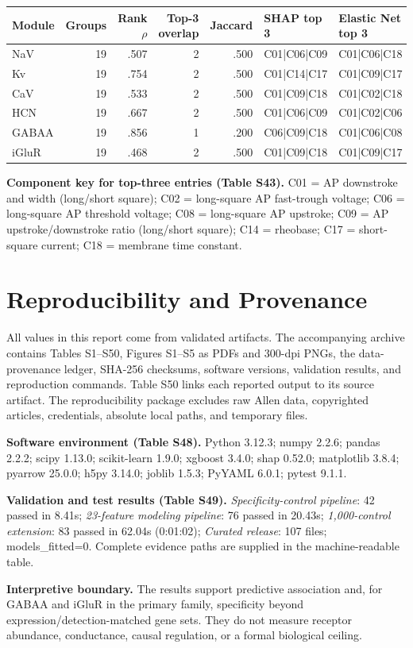 \documentclass[11pt]{article}
\newcommand{\tablefont}{\fontsize{9.5}{11.2}\selectfont}
\newcommand{\sourcecaption}[1]{\Needspace{10\baselineskip}\vspace{2pt}{\small\bfseries #1}\par\vspace{2pt}}
\begin{document}
\sourcecaption{Concordance between grouped TreeSHAP importance and grouped absolute Elastic Net coefficients (Table S47).}
\begin{center}\tablefont
\setlength{\tabcolsep}{2.7pt}
\begin{tabularx}{\linewidth}{@{}lrrrrYY@{}}
\toprule
Module & Groups & Rank $\rho$ & Top-3 overlap & Jaccard & SHAP top 3 & Elastic Net top 3 \\
\midrule
NaV & 19 & .507 & 2 & .500 & C01|C06|C09 & C01|C06|C18 \\
Kv & 19 & .754 & 2 & .500 & C01|C14|C17 & C01|C09|C17 \\
CaV & 19 & .533 & 2 & .500 & C01|C09|C18 & C01|C02|C18 \\
HCN & 19 & .667 & 2 & .500 & C01|C06|C09 & C01|C02|C06 \\
GABAA & 19 & .856 & 1 & .200 & C06|C09|C18 & C01|C06|C08 \\
iGluR & 19 & .468 & 2 & .500 & C01|C09|C18 & C01|C09|C17 \\
\bottomrule
\end{tabularx}
\end{center}

{\small\textbf{Component key for top-three entries (Table S43).} C01 = AP downstroke and width (long/short square); C02 = long-square AP fast-trough voltage; C06 = long-square AP threshold voltage; C08 = long-square AP upstroke; C09 = AP upstroke/downstroke ratio (long/short square); C14 = rheobase; C17 = short-square current; C18 = membrane time constant.}

\section{Reproducibility and Provenance}
All values in this report come from validated artifacts. The accompanying archive contains Tables S1--S50, Figures S1--S5 as PDFs and 300-dpi PNGs, the data-provenance ledger, SHA-256 checksums, software versions, validation results, and reproduction commands. Table S50 links each reported output to its source artifact. The reproducibility package excludes raw Allen data, copyrighted articles, credentials, absolute local paths, and temporary files.

\textbf{Software environment (Table S48).} Python 3.12.3; numpy 2.2.6; pandas 2.2.2; scipy 1.13.0; scikit-learn 1.9.0; xgboost 3.4.0; shap 0.52.0; matplotlib 3.8.4; pyarrow 25.0.0; h5py 3.14.0; joblib 1.5.3; PyYAML 6.0.1; pytest 9.1.1.

{\small\textbf{Validation and test results (Table S49).} \textit{Specificity-control pipeline}: 42 passed in 8.41s; \textit{23-feature modeling pipeline}: 76 passed in 20.43s; \textit{1,000-control extension}: 83 passed in 62.04s (0:01:02); \textit{Curated release}: 107 files; models\_fitted=0. Complete evidence paths are supplied in the machine-readable table.}

\textbf{Interpretive boundary.} The results support predictive association and, for GABAA and iGluR in the primary family, specificity beyond expression/detection-matched gene sets. They do not measure receptor abundance, conductance, causal regulation, or a formal biological ceiling.
\end{document}

